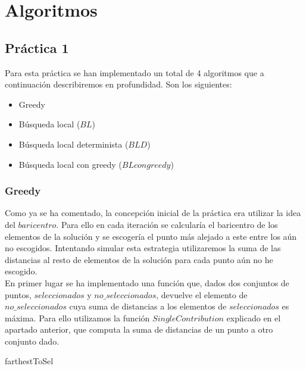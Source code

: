 \documentclass[11pt,a4paper]{article}
\begin{document}
	\section{Algoritmos}
	
 	\subsection{Práctica 1}
	
	Para esta práctica se han implementado un total de 4 algoritmos que a continuación describiremos en profundidad. Son los siguientes:
	\begin{itemize}
		\item Greedy
		\item Búsqueda local ($BL$)
		\item Búsqueda local determinista ($BLD$)
		\item Búsqueda local con greedy ($BL con greedy$)
	\end{itemize}
		
	\subsubsection{Greedy}
	
	Como ya se ha comentado, la concepción inicial de la práctica era utilizar la idea del $baricentro$. Para ello en cada iteración se calcularía el baricentro de los elementos de la solución y se escogería el punto más alejado a este entre los aún no escogidos. Intentando simular esta estrategia utilizaremos la suma de las distancias al resto de elementos de la solución para cada punto aún no he escogido. \\
	
	En primer lugar se ha implementado una función que, dados dos conjuntos de puntos, $seleccionados$ y $no\_seleccionados$, devuelve el elemento de $no\_seleccionados$ cuya suma de distancias a los elementos de $seleccionados$ es máxima. Para ello utilizamos la función $SingleContribution$ explicado en el apartado anterior, que computa la suma de distancias de un punto a otro conjunto dado. \\ 

	\begin{algorithm}[H]
		\caption{farthestToSel}
	\end{algorithm}
	
\end{document}
